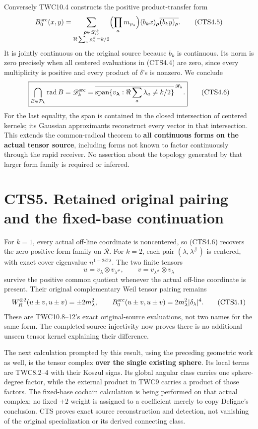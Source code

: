Conversely TWC10.4 constructs the positive product-transfer form \[
B_0^{\rm src}(x,y)=\sum_{\substack{\boldsymbol\rho\in\mathscr Z_O^k\\\Re\sum_a\rho_a^\#=k/2}}
\Bigl(\prod_a m_{\rho_a}\Bigr)(b_kx)_{\boldsymbol\rho}
\overline{(b_ky)_{\boldsymbol\rho}}.
\tag{CTS4.5}
\] It is jointly continuous on the original source because \(b_k\) is
continuous. Its norm is zero precisely when all centered evaluations in
(CTS4.4) are zero, since every multiplicity is positive and every
product of \(\delta\)'s is nonzero. We conclude \[
\boxed{\bigcap_{B\in\mathcal P_k}\operatorname{rad}B
=\mathscr D_k^{\rm src}
=\overline{\operatorname{span}\{v_{\boldsymbol\lambda}:\Re\sum_a\lambda_a\ne k/2\}}^{\,\mathscr R_k}.}
\tag{CTS4.6}
\] For the last equality, the span is contained in the closed
intersection of centered kernels; its Gaussian approximants reconstruct
every vector in that intersection. This extends the common-radical
theorem to \textbf{all continuous forms on the actual tensor source},
including forms not known to factor continuously through the rapid
receiver. No assertion about the topology generated by that larger form
family is required or inferred.

\section{CTS5. Retained original pairing and the fixed-base
continuation}\label{cts5.-retained-original-pairing-and-the-fixed-base-continuation}

For \(k=1\), every actual off-line coordinate is noncentered, so
(CTS4.6) recovers the zero positive-form family on \(\mathcal R\). For
\(k=2\), each pair \((\lambda,\lambda^\#)\) is centered, with exact
cover eigenvalue \(n^{1+2i\Im\lambda}\). The two finite tensors \[
u=v_\lambda\otimes v_{\lambda^\#},\qquad v=v_{\lambda^\#}\otimes v_\lambda
\] survive the positive common quotient whenever the actual off-line
coordinate is present. Their original complementary Weil tensor pairing
remains \[
W_R^{\otimes2}(u\pm v,u\pm v)=\pm2m_\lambda^2,
\qquad B_0^{\rm src}(u\pm v,u\pm v)=2m_\lambda^2|\delta_\lambda|^4.
\tag{CTS5.1}
\] These are TWC10.8--12's exact original-source evaluations, not two
names for the same form. The completed-source injectivity now proves
there is no additional unseen tensor kernel explaining their difference.

The next calculation prompted by this result, using the preceding
geometric work as well, is the tensor complex \textbf{over the single
existing sphere}. Its local terms are TWC8.2--4 with their Koszul signs.
Its global angular class carries one sphere-degree factor, while the
external product in TWC9 carries a product of those factors. The
fixed-base cochain calculation is being performed on that actual
complex; no fixed \(+2\) weight is assigned to a coefficient merely to
copy Deligne's conclusion. CTS proves exact source reconstruction and
detection, not vanishing of the original specialization or its derived
connecting class.


